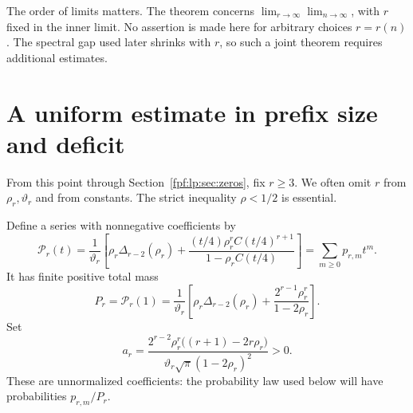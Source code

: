 \documentclass[11pt]{article}
\numberwithin{equation}{section}
\theoremstyle{definition}
\begin{document}
The order of limits matters. The theorem concerns
\(\lim_{r\to\infty}\lim_{n\to\infty}\), with \(r\) fixed in the
inner limit. No assertion is made here for arbitrary choices \(r=r(n)\).
The spectral gap used later shrinks with \(r\), so such a joint theorem
requires additional estimates.

\section{A uniform estimate in prefix size and deficit}
\label{fpf:lp:sec:kernel}

From this point through Section~\ref{fpf:lp:sec:zeros}, fix \(r\ge3\). We
often omit \(r\) from \(\rho_r,\vartheta_r\) and from constants. The strict
inequality \(\rho<1/2\) is essential.

Define a series with nonnegative coefficients by
\begin{equation}\label{fpf:lp:eq:residue-series}
 \mathcal P_r(t)=\frac1{\vartheta_r}\left[
 \rho_r\Delta_{r-2}(\rho_r)
 +\frac{(t/4)\rho_r^r C(t/4)^{r+1}}{1-\rho_r C(t/4)}\right]
 =\sum_{m\ge0}p_{r,m}t^m.
\end{equation}
It has finite positive total mass
\begin{equation}\label{fpf:lp:eq:P}
 P_r=\mathcal P_r(1)=\frac1{\vartheta_r}\left[
 \rho_r\Delta_{r-2}(\rho_r)
 +\frac{2^{r-1}\rho_r^r}{1-2\rho_r}\right].
\end{equation}
Set
\begin{equation}\label{fpf:lp:eq:a}
 a_r=\frac{2^{r-2}\rho_r^r\bigl((r+1)-2r\rho_r\bigr)}
 {\vartheta_r\sqrt\pi(1-2\rho_r)^2}>0.
\end{equation}
These are unnormalized coefficients: the probability law used below
will have probabilities \(p_{r,m}/P_r\).
\end{document}
